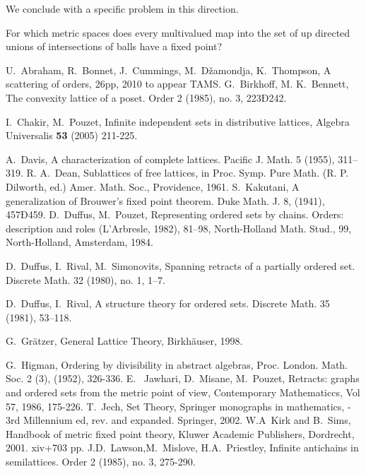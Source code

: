 \documentclass[12pt]{amsart}
\begin{document}
\medskip 
We conclude with a specific problem in this direction. 

\begin{problem} 
For which metric spaces does  every multivalued map into the set of up
directed unions of intersections of balls have a fixed point?
\end{problem} 

\begin{thebibliography}{10pt}
U.~Abraham, R.~Bonnet, J.~Cummings, M.~D\v{z}amondja, K.~Thompson, 
\newblock A scattering of orders, 26pp, 2010 to appear TAMS.
G.~Birkhoff, M. K.~Bennett,
\newblock The convexity lattice of a poset. Order 2 (1985), no. 3, 223Ð242.

I.~Chakir, M.~Pouzet, 
\newblock Infinite independent sets in distributive lattices, Algebra Universalis {\bf 53} (2005) 211-225. 

A.~Davis,  
\newblock A characterization of complete lattices.  Pacific J. Math.  5  (1955), 311--319. 
 R. A.~Dean, 
 \newblock Sublattices of free lattices, in Proc. Symp. Pure Math. (R. P. Dilworth, ed.) Amer. Math. Soc., Providence, 1961.
S.~Kakutani, 
\newblock A generalization of Brouwer's fixed point theorem.  Duke Math. J.  8,  (1941), 457Ð459.
D.~Duffus, M.~Pouzet, 
\newblock   Representing ordered sets by chains. 
Orders: description and roles (L'Arbresle, 1982), 81--98, 
North-Holland Math. Stud., 99, North-Holland, Amsterdam, 1984. 

D.~Duffus, I.~Rival, M.~Simonovits,  
\newblock Spanning retracts of a partially ordered set. 
Discrete Math. 32 (1980), no. 1, 1--7.

D.~Duffus, I.~Rival,
\newblock A structure theory for ordered sets. 
Discrete Math. 35 (1981), 53--118.

G.~Gr\"{a}tzer, 
\newblock General Lattice Theory, 
Birkh\"auser, 1998.

G.~Higman, 
\newblock Ordering by divisibility in abstract 
algebras, Proc. London. Math. Soc. 2 (3),
(1952), 326-336.
E. ~Jawhari, D.~Misane, M.~Pouzet,
\newblock Retracts:  graphs and ordered sets from the metric point of view, Contemporary Mathematiccs, Vol 57, 1986, 175-226.
 T.~Jech, 
\newblock Set Theory, Springer monographs in mathematics, - 3rd Millennium ed, rev. and expanded. Springer, 2002. 
W.A~Kirk and B.~Sims, Handbook of metric fixed point theory, Kluwer Academic Publishers, Dordrecht, 2001. xiv+703 pp.
J.D.~Lawson,M.~Mislove, H.A.~Priestley,
\newblock  Infinite antichains in semilattices.  Order  2  (1985),  no. 3, 275-290. 


\end{thebibliography}
\end{document}
